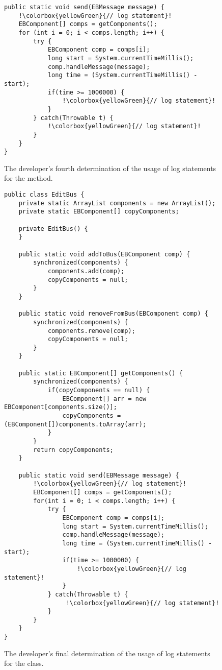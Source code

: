 \begin{figure}[p]
\def\baselinestretch{1}
\begin{lstlisting}[escapechar=!]
public static void send(EBMessage message) {
    !\colorbox{yellowGreen}{// log statement}!
    EBComponent[] comps = getComponents();
    for (int i = 0; i < comps.length; i++) {
        try {
            EBComponent comp = comps[i];
            long start = System.currentTimeMillis();
            comp.handleMessage(message);
            long time = (System.currentTimeMillis() - start);
            if(time >= 1000000) {
                !\colorbox{yellowGreen}{// log statement}!
            }
        } catch(Throwable t) {
            !\colorbox{yellowGreen}{// log statement}!
        }
    }
}
\end{lstlisting}
\caption[The developer's fourth determination of the usage of log statements.]{The developer's fourth determination of the usage of log statements for the  method.\label{ch2-ex-logged-m4}}
\end{figure}

\begin{figure}[p]
\def\baselinestretch{0.94}
\begin{lstlisting}[escapechar=!]
public class EditBus {
    private static ArrayList components = new ArrayList();
    private static EBComponent[] copyComponents;

    private EditBus() {
    }

    public static void addToBus(EBComponent comp) {
        synchronized(components) {
            components.add(comp);
            copyComponents = null;
        }
    }

    public static void removeFromBus(EBComponent comp) {
        synchronized(components) {
            components.remove(comp);
            copyComponents = null;
        }
    }

    public static EBComponent[] getComponents() {
        synchronized(components) {
            if(copyComponents == null) {
                EBComponent[] arr = new EBComponent[components.size()];
                copyComponents = (EBComponent[])components.toArray(arr);
            }
        }
        return copyComponents;
    }

    public static void send(EBMessage message) {
        !\colorbox{yellowGreen}{// log statement}!
        EBComponent[] comps = getComponents();
        for(int i = 0; i < comps.length; i++) {
            try {
                EBComponent comp = comps[i];
                long start = System.currentTimeMillis();
                comp.handleMessage(message);
                long time = (System.currentTimeMillis() - start);
                if(time >= 1000000) {
                    !\colorbox{yellowGreen}{// log statement}!
                }
            } catch(Throwable t) {
                 !\colorbox{yellowGreen}{// log statement}!
            }
        }
    }
}
\end{lstlisting}

\caption[The developer's final determination of the usage of log statements.]{The developer's final determination of the usage of log statements for the  class.\label{ch2-ex-logged}}
\end{figure}

